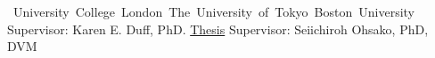 %
%
%


\begin{cventries}

    {\vspace*{-0.45cm}\mbox{\hspace{-0.35mm} University College London
        \hspace{21.45mm} The University of Tokyo
        \hspace{25.25mm} Boston University}}
    {}
    {}
    {\hspace{-0.1mm} {\small{Supervisor: Karen E. Duff, PhD. \href{https://eturkes.com/media/phd-thesis/}{Thesis}}}
        \hspace{15mm} {\small{Supervisor: Seiichiroh Ohsako, PhD, DVM}}}

\end{cventries}

\vspace*{-0.2cm}
